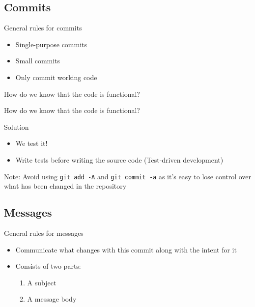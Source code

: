 \subsection{Commits}
\begin{frame}
\begin{block}{General rules for commits}
   \begin{itemize}
       \item Single-purpose commits
       \pause
       \item Small commits
       \pause
       \item Only commit working code
   \end{itemize}
\end{block}
\pause
\begin{question}
    How do we know that the code is functional?
\end{question}
\end{frame}

\begin{frame}
\begin{question}
    How do we know that the code is functional?
\end{question}
\pause
\begin{block}{Solution}
\begin{itemize}
    \item We test it!
    \item Write tests before writing the source code (Test-driven development)
\end{itemize}
\end{block}
\end{frame}

\begin{frame}
    \begin{alertblock}{Note:}
    Avoid using \lstinline{git add -A} and \lstinline{git commit -a} as it's easy to lose control over what has been changed in the repository
    \end{alertblock}
\end{frame}

\subsection{Messages}

\begin{frame}
\begin{block}{General rules for messages}
  \begin{itemize}
      \item Communicate what changes with this commit along with the intent for it
      \item Consists of two parts:
      \begin{enumerate}
          \item A subject
          \item A message body
      \end{enumerate}
  \end{itemize}
\end{block}
\end{frame}


